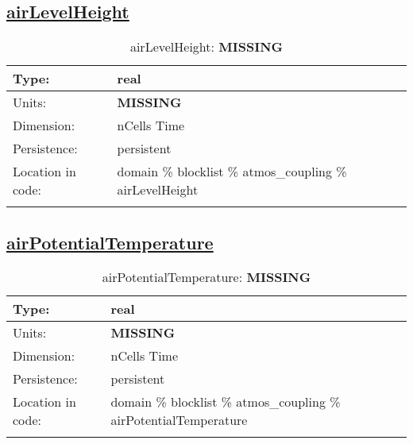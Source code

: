 \subsection[airLevelHeight]{\hyperref[sec:var_tab_atmos_coupling]{airLevelHeight}}
\label{subsec:var_sec_atmos_coupling_airLevelHeight}
\begin{center}
\begin{longtable}{| p{2.0in} | p{4.0in} |}
        \hline 
        Type: & real \\
        \hline 
        Units: & {\bf \color{red} MISSING} \\
        \hline 
        Dimension: & nCells Time \\
        \hline 
        Persistence: & persistent \\
        \hline 
         Location in code: & domain \% blocklist \% atmos\_coupling \% airLevelHeight \\
         \hline 
    \caption{airLevelHeight: {\bf \color{red} MISSING}}
\end{longtable}
\end{center}
\subsection[airPotentialTemperature]{\hyperref[sec:var_tab_atmos_coupling]{airPotentialTemperature}}
\label{subsec:var_sec_atmos_coupling_airPotentialTemperature}
\begin{center}
\begin{longtable}{| p{2.0in} | p{4.0in} |}
        \hline 
        Type: & real \\
        \hline 
        Units: & {\bf \color{red} MISSING} \\
        \hline 
        Dimension: & nCells Time \\
        \hline 
        Persistence: & persistent \\
        \hline 
         Location in code: & domain \% blocklist \% atmos\_coupling \% airPotentialTemperature \\
         \hline 
    \caption{airPotentialTemperature: {\bf \color{red} MISSING}}
\end{longtable}
\end{center}
